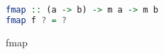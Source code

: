 \begin{figure}
    \centering
    \begin{lstlisting}[language=Haskell]
fmap :: (a -> b) -> m a -> m b
fmap f ? = ?\end{lstlisting}
    \caption{fmap}
    \label{fig:fmap}
\end{figure}